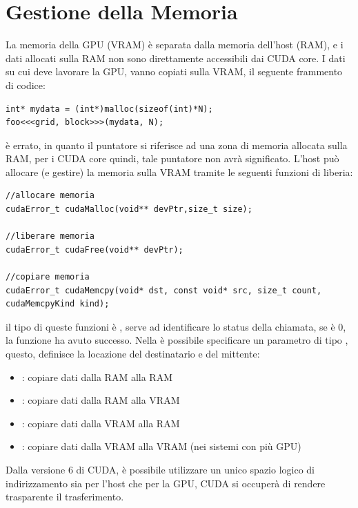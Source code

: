 \documentclass[10pt, letterpaper]{report}
\begin{document}
\section{Gestione della Memoria}
La memoria della GPU (VRAM) è separata dalla memoria dell'host (RAM), e i dati allocati sulla RAM non sono direttamente accessibili dai CUDA core. I dati su cui deve lavorare la GPU, vanno copiati sulla VRAM, il seguente frammento di codice:
\begin{lstlisting}[style=CStyle]
int* mydata = (int*)malloc(sizeof(int)*N);
foo<<<grid, block>>>(mydata, N);
\end{lstlisting}
è errato, in quanto il puntatore  si riferisce ad una zona di memoria allocata sulla RAM, per i CUDA core quindi, tale puntatore non avrà significato. L'host può allocare (e gestire) la memoria sulla VRAM tramite le seguenti funzioni di liberia:
\begin{lstlisting}[style=CStyle]
//allocare memoria
cudaError_t cudaMalloc(void** devPtr,size_t size); 

//liberare memoria
cudaError_t cudaFree(void** devPtr); 

//copiare memoria
cudaError_t cudaMemcpy(void* dst, const void* src, size_t count, cudaMemcpyKind kind);
\end{lstlisting}
il tipo di queste funzioni è , serve ad identificare lo status della chiamata, se è 0, la funzione ha avuto successo. Nella   è possibile specificare un parametro di tipo 
, questo, definisce la locazione del destinatario e del mittente:\begin{itemize}
    \item {} : copiare dati dalla RAM alla RAM
    \item {} : copiare dati dalla RAM alla VRAM
    \item {} : copiare dati dalla VRAM alla RAM
    \item {} : copiare dati dalla VRAM alla VRAM (nei sistemi con più GPU)
\end{itemize}
Dalla versione 6 di CUDA, è possibile utilizzare un unico spazio logico di indirizzamento sia per l'host che per la GPU, CUDA si occuperà di rendere trasparente il trasferimento.
\end{document}
